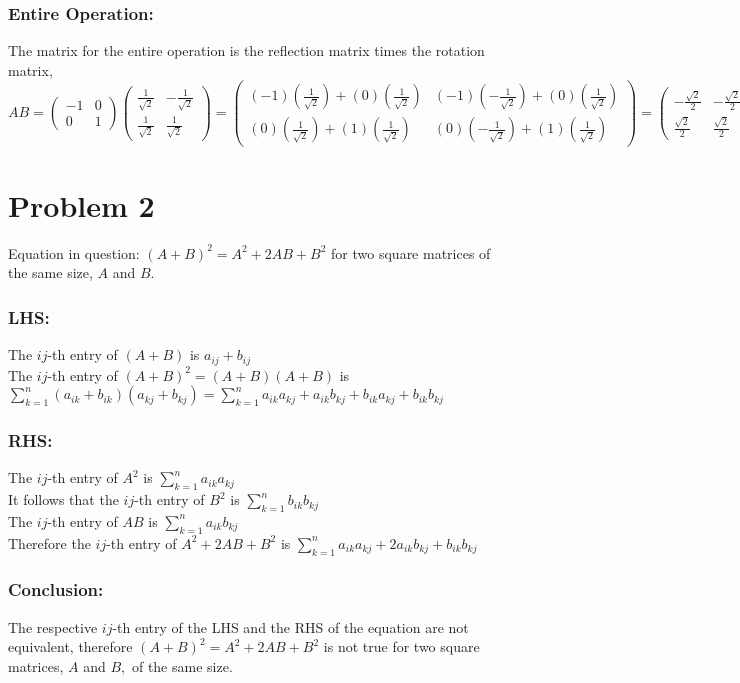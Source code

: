 \documentclass{article}
\begin{document}
\subsubsection*{Entire Operation:}
The matrix for the entire operation is the reflection matrix times the rotation matrix,\\
$AB=\begin{pmatrix}-1 & 0\\ 0 & 1\end{pmatrix}\begin{pmatrix}\frac{1}{\sqrt{2}} & -\frac{1}{\sqrt{2}}\\ \frac{1}{\sqrt{2}} & \frac{1}{\sqrt{2}} \end{pmatrix}=\begin{pmatrix}(-1)(\frac{1}{\sqrt{2}}) +(0)(\frac{1}{\sqrt{2}})& (-1)(-\frac{1}{\sqrt{2}})+(0)(\frac{1}{\sqrt{2}})\\ (0)(\frac{1}{\sqrt{2}}) +(1)(\frac{1}{\sqrt{2}})& (0)(-\frac{1}{\sqrt{2}})+(1)(\frac{1}{\sqrt{2}}) \end{pmatrix}=\begin{pmatrix}-\frac{\sqrt{2}}{2} & -\frac{\sqrt{2}}{2}\\ \frac{\sqrt{2}}{2} & \frac{\sqrt{2}}{2} \end{pmatrix}$
\pagebreak

\section*{Problem 2}
Equation in question: $(A+B)^2=A^2+2AB+B^2$ for two square matrices of the same size, $A$ and $B$.
\subsubsection*{LHS:}
The $ij$-th entry of $(A+B) $ is $a_{ij}+b_{ij}$\\
The $ij$-th entry of $(A+B)^2 = (A+B)(A+B)$ is $\sum_{k=1}^n (a_{ik}+b_{ik})(a_{kj}+b_{kj})= \sum_{k=1}^n a_{ik}a_{kj}+a_{ik}b_{kj}+b_{ik}a_{kj}+b_{ik}b_{kj}$
\subsubsection*{RHS:}
The $ij$-th entry of $A^2$ is $\sum_{k=1}^n a_{ik}a_{kj}$\\
It follows that the $ij$-th entry of $B^2$ is $\sum_{k=1}^n b_{ik}b_{kj}$\\
The $ij$-th entry of $AB$ is $\sum_{k=1}^n a_{ik}b_{kj}$\\
Therefore the $ij$-th entry of $A^2+2AB+B^2$ is $\sum_{k=1}^n a_{ik}a_{kj} + 2a_{ik}b_{kj}+ b_{ik}b_{kj}$
\subsubsection*{Conclusion:}
The respective $ij$-th entry of the LHS and the RHS of the equation are not equivalent, therefore $(A+B)^2=A^2+2AB+B^2$ is not true for two square matrices, $A$ and $B,$ of the same size.
\end{document}
